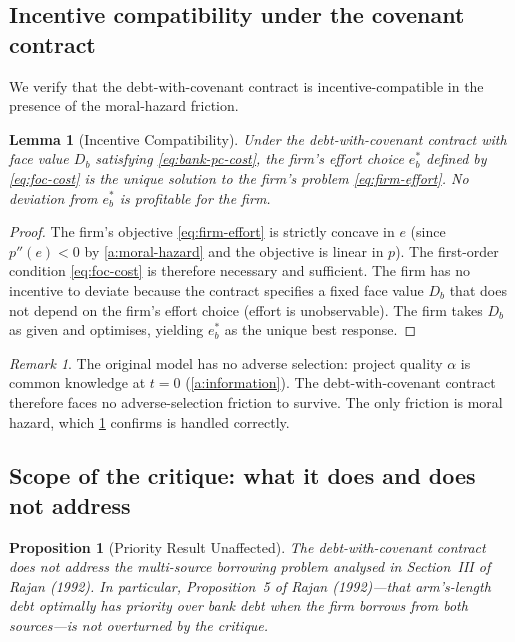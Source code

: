 \documentclass[12pt,a4paper]{article}
\theoremstyle{plain}
\newtheorem{proposition}[theorem]{Proposition}
\newtheorem{lemma}[theorem]{Lemma}
\theoremstyle{definition}
\theoremstyle{remark}
\newtheorem{remark}[theorem]{Remark}
\begin{document}
\subsection{Incentive compatibility under the covenant contract}
\label{sec:ic}

We verify that the debt-with-covenant contract is incentive-compatible in the presence of the moral-hazard friction.

\begin{lemma}[Incentive Compatibility]
\label{l:ic}
Under the debt-with-covenant contract with face value $D_b$ satisfying \cref{eq:bank-pc-cost}, the firm's effort choice $e_b^*$ defined by \cref{eq:foc-cost} is the unique solution to the firm's problem \cref{eq:firm-effort}. No deviation from $e_b^*$ is profitable for the firm.
\end{lemma}

\begin{proof}
The firm's objective \cref{eq:firm-effort} is strictly concave in $e$ (since $p''(e) < 0$ by \cref{a:moral-hazard} and the objective is linear in $p$). The first-order condition \cref{eq:foc-cost} is therefore necessary and sufficient. The firm has no incentive to deviate because the contract specifies a fixed face value $D_b$ that does not depend on the firm's effort choice (effort is unobservable). The firm takes $D_b$ as given and optimises, yielding $e_b^*$ as the unique best response.
\end{proof}

\begin{remark}
\label{r:no-adverse-selection}
The original model has no adverse selection: project quality $\alpha$ is common knowledge at $t = 0$ (\cref{a:information}). The debt-with-covenant contract therefore faces no adverse-selection friction to survive. The only friction is moral hazard, which \cref{l:ic} confirms is handled correctly.
\end{remark}

\subsection{Scope of the critique: what it does and does not address}
\label{sec:scope}

\begin{proposition}[Priority Result Unaffected]
\label{p:priority}
The debt-with-covenant contract does not address the multi-source borrowing problem analysed in Section~III of Rajan (1992). In particular, Proposition~5 of Rajan (1992)---that arm's-length debt optimally has priority over bank debt when the firm borrows from both sources---is not overturned by the critique.
\end{proposition}
\end{document}
